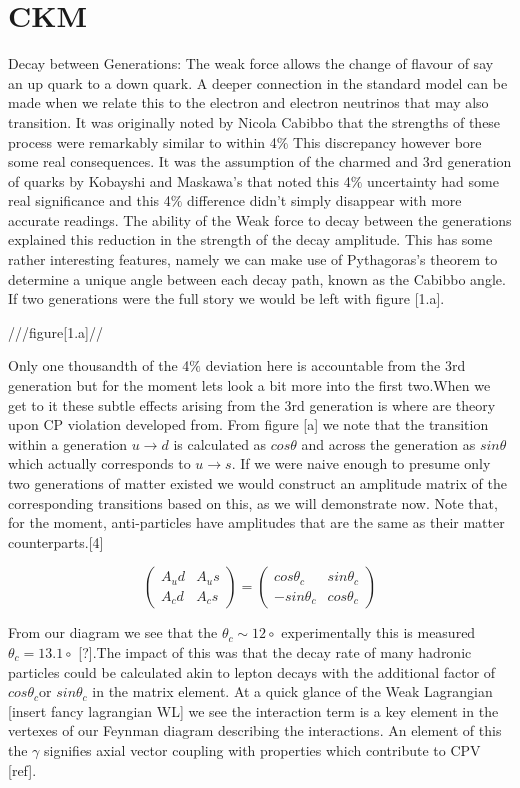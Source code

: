\documentclass[11pt,onecolumn]{article}
\begin{document}
\section*{CKM}

Decay between Generations:
The weak force allows the change of flavour of say an up quark to a down quark. A deeper connection in the standard model can be made when we relate this to the electron and electron neutrinos that may also transition. It was originally noted by Nicola Cabibbo that the strengths of these process were remarkably similar to within 4$\%$ This discrepancy however bore some real consequences. It was the assumption of the charmed and 3rd generation of quarks by Kobayshi and Maskawa’s that noted this 4$\%$ uncertainty had some real significance and this 4$\%$ difference didn't simply disappear with more accurate readings. The ability of the Weak force to decay between the generations explained this reduction in the strength of the decay amplitude. This has some rather interesting features, namely we can make use of Pythagoras’s theorem to determine a unique angle between each decay path, known as the Cabibbo angle. If two generations were the full story we would be left with figure [1.a].

///figure[1.a]//

Only one thousandth of the 4$\%$ deviation here is accountable from the 3rd generation but for the moment lets look a bit more into the first two.When we get to it these subtle effects arising from the 3rd generation is where are theory upon CP violation developed from. From figure [a] we note that the transition within a generation $u\rightarrow d$ is calculated as $cos\theta$ and across the generation as $sin\theta$ which actually corresponds to $u\rightarrow s$. If we were naive enough to presume only two generations of matter existed we would construct an amplitude matrix of the corresponding transitions based on this, as we will demonstrate now. Note that, for the moment, anti-particles have amplitudes that are the same as their matter counterparts.[4]

\[\begin{pmatrix} A_ud & A_us \\ A_cd & A_cs \end{pmatrix} = \begin{pmatrix} cos\theta_c & sin\theta_c \\ -sin\theta_c & cos\theta_c \end{pmatrix}\]

From our diagram we see that the $\theta_c\sim 12\circ$ experimentally this is measured $\theta_c = 13.1\circ$ [?].The impact of this was that the decay rate of many hadronic particles could be calculated akin to lepton decays with the additional factor of $cos\theta_c$or $sin\theta_c$ in the matrix element. At a quick glance of the Weak Lagrangian [insert fancy lagrangian WL] we see the interaction term is a key element in the vertexes of our Feynman diagram describing the interactions. An element of this the $\gamma$ signifies axial vector coupling with properties which contribute to CPV [ref].
\end{document}

